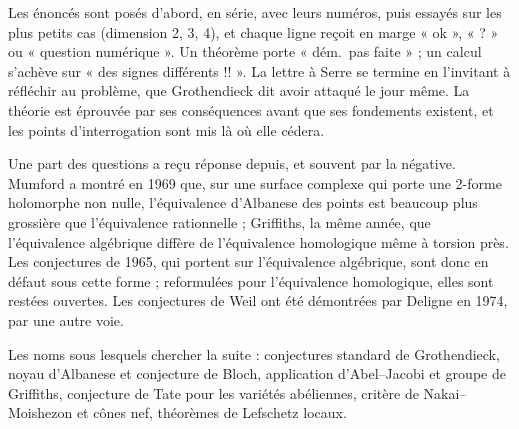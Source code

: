 \documentclass[11pt,a4paper]{article}
\begin{document}
\begin{resume}
Les énoncés sont posés d'abord,
en série, avec leurs numéros, puis essayés sur les plus petits cas
(dimension 2, 3, 4), et chaque ligne reçoit en marge « ok », « ? » ou
« question numérique ». Un théorème porte « dém.\ pas faite » ; un calcul
s'achève sur « des signes différents !! ». La lettre à Serre se termine en
l'invitant à réfléchir au problème, que Grothendieck dit avoir attaqué le jour
même. La théorie est éprouvée par ses conséquences avant que ses
fondements existent, et les points d'interrogation sont mis là où elle
cédera.

Une part des questions a reçu réponse depuis, et souvent par la négative.
Mumford a montré en 1969 que, sur une surface complexe qui porte une 2-forme
holomorphe non nulle, l'équivalence d'Albanese des points est beaucoup plus
grossière que l'équivalence rationnelle ; Griffiths, la même année, que
l'équivalence algébrique diffère de l'équivalence homologique même à torsion
près. Les conjectures de 1965, qui portent sur l'équivalence algébrique, sont
donc en défaut sous cette forme ; reformulées pour l'équivalence homologique,
elles sont restées ouvertes. Les conjectures de Weil ont été démontrées par
Deligne en 1974, par une autre voie.

Les noms sous lesquels chercher la suite : conjectures standard de
Grothendieck, noyau d'Albanese et conjecture de Bloch, application
d'Abel--Jacobi et groupe de Griffiths, conjecture de Tate pour les variétés
abéliennes, critère de Nakai--Moishezon et cônes nef, théorèmes de Lefschetz
locaux.

\end{resume}
\end{document}
